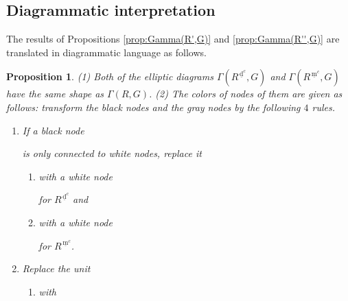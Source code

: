 \documentclass[11pt]{amsart}
\newcommand{\dc}{\,\underline{\mathrm{d}}^c}
\newcommand{\mc}{\, \underline{\mathrm{m}}^c}
\newtheorem{prop}[thm]{Proposition}%
\begin{document}
{\subsection{Diagrammatic interpretation}\label{sect:ans-Problem2}
The results of Propositions  \ref{prop:Gamma(R',G)} and  \ref{prop:Gamma(R'',G)} are translated in diagrammatic language as
follows.
\begin{prop}\label{prop:red-pair} 
{\rm (1)} Both of the elliptic diagrams $\Gamma(R^{\dc},G)$ and 
$\Gamma(R^{\mc},G)$ have the same shape as $\Gamma(R,G)$.
\vskip 1mm
\noindent
{\rm (2)} The colors of nodes of them are given as follows{\rm :} 
transform the black nodes and the gray nodes by the following $4$ rules.
\begin{enumerate}
\item[(D0)] If a black node 
is only connected to white nodes, 
replace it 
\begin{enumerate}
\item[i)] with a white node 
 for $R^{\dc}$ and
\item[ii)] with a white node 
for $R^{\mc}$.
\end{enumerate}
\vskip 1mm
\item[(D1)] Replace the unit
\begin{enumerate}
\item[i)] with 
\end{enumerate}
\end{enumerate}
\end{prop}}
\end{document}
